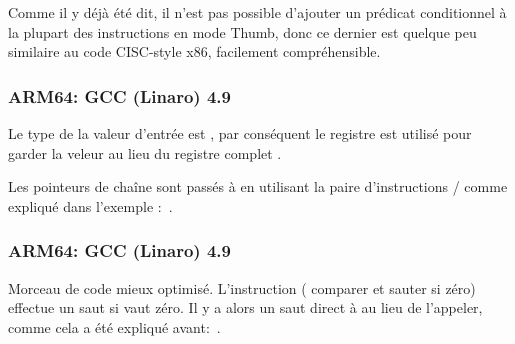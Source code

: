 
Comme il y déjà été dit, il n'est pas possible d'ajouter un prédicat conditionnel
à la plupart des instructions en mode Thumb, donc ce dernier est quelque peu similaire
au code \ac{CISC}-style x86, facilement compréhensible.

\subsubsection{ARM64: GCC (Linaro) 4.9 \NonOptimizing}



Le type de la valeur d'entrée est \Tint, par conséquent le registre  est
utilisé pour garder la veleur au lieu du registre complet .

Les pointeurs de chaîne sont passés à \puts en utilisant la paire d'instructions
/ comme expliqué dans l'exemple \q{\HelloWorldSectionName}:~.

\subsubsection{ARM64: GCC (Linaro) 4.9 \Optimizing}



Morceau de code mieux optimisé.
L'instruction  ( comparer et sauter si zéro)
effectue un saut si  vaut zéro.
Il y a alors un saut direct à \puts au lieu de l'appeler, comme cela a été expliqué
avant:~.
